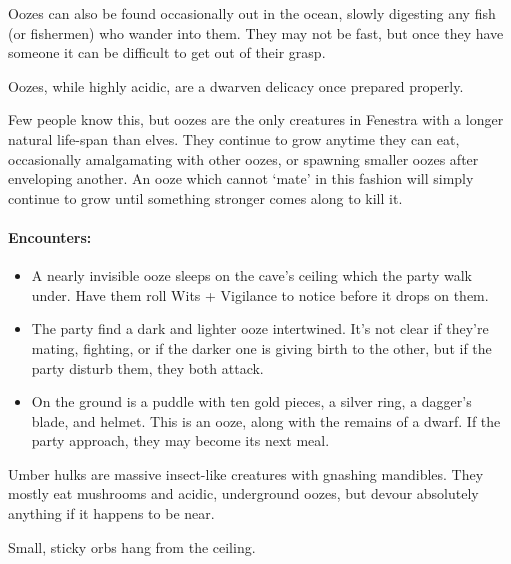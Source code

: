 \begin{multicols}{2}
Oozes can also be found occasionally out in the ocean, slowly digesting any fish (or fishermen) who wander into them.
They may not be fast, but once they have someone it can be difficult to get out of their grasp.

Oozes, while highly acidic, are a dwarven delicacy once prepared properly.

Few people know this, but oozes are the only creatures in Fenestra with a longer natural life-span than elves.
They continue to grow anytime they can eat, occasionally amalgamating with other oozes, or spawning smaller oozes after enveloping another.
An ooze which cannot `mate' in this fashion will simply continue to grow until something stronger comes along to kill it.

\jelly

\paragraph{Encounters:}

\begin{itemize}

  \item
  A nearly invisible ooze sleeps on the cave's ceiling which the party walk under.
  Have them roll Wits + Vigilance to notice before it drops on them.
  \item
  The party find a dark and lighter ooze intertwined.
  It's not clear if they're mating, fighting, or if the darker one is giving birth to the other, but if the party disturb them, they both attack.
  \item
  On the ground is a puddle with ten gold pieces, a silver ring, a dagger's blade, and helmet.
  This is an ooze, along with the remains of a dwarf.
  If the party approach, they may become its next meal.

\end{itemize}

\jelly

\label{umber_hulk}

Umber hulks are massive insect-like creatures with gnashing mandibles.
They mostly eat mushrooms and acidic, underground oozes, but devour absolutely anything if it happens to be near.

\begin{boxtext}

  Small, sticky orbs hang from the ceiling.

\end{boxtext}


\end{multicols}

